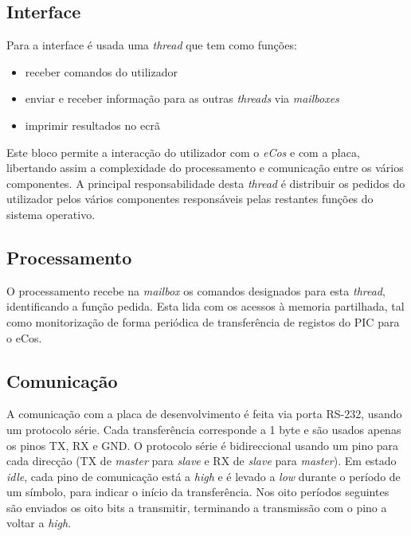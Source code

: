 \documentclass[a4paper]{article}
\begin{document}
	\subsection{Interface}
    
    Para a interface é usada uma \textit{thread} que tem como funções:
	
    \begin{itemize}
      \item receber comandos do utilizador
      \item enviar e receber informação para as outras \textit{threads} via \textit{mailboxes}
      \item imprimir resultados no ecrã
    \end{itemize}

	Este bloco permite a interacção do utilizador com o \textit{eCos} e com a placa, libertando assim a complexidade do processamento e comunicação entre os vários componentes. A principal responsabilidade desta \textit{thread} é distribuir os pedidos do utilizador pelos vários componentes responsáveis pelas restantes funções do sistema operativo.


	\subsection{Processamento}

	O processamento recebe na \textit{mailbox} os comandos designados para esta \textit{thread}, identificando a função pedida. Esta lida com os acessos à memoria partilhada, tal como monitorização de forma periódica de transferência de registos do PIC para o eCos.



	\subsection{Comunicação}

	A comunicação com a placa de desenvolvimento é feita via porta RS-232, usando um protocolo série. Cada transferência corresponde a 1 byte e são usados apenas os pinos TX, RX e GND. O protocolo série é bidireccional usando um pino para cada direcção (TX de \textit{master} para \textit{slave} e RX de \textit{slave} para \textit{master}). Em estado \textit{idle}, cada pino de comunicação está a \textit{high} e é levado a \textit{low} durante o período de um símbolo, para indicar o início da transferência. Nos oito períodos seguintes são enviados os oito bits a transmitir, terminando a transmissão com o pino a voltar a \textit{high}.
    
\end{document}
